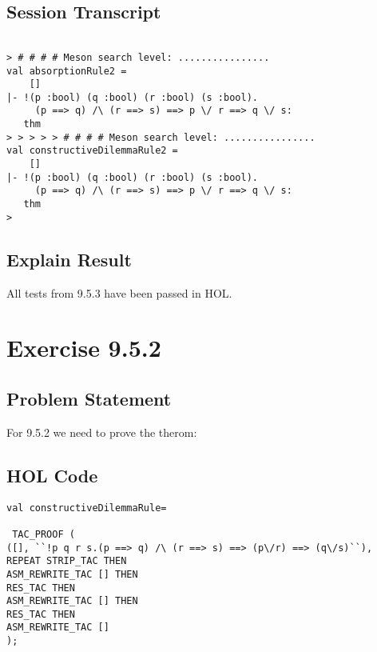 \documentclass{report}
\begin{document}
\section{Session Transcript}
\label{Session Trans 953}
\setcounter{sessioncount}{0}
\begin{session}
  \begin{scriptsize}
\begin{verbatim}

> # # # # Meson search level: ................
val absorptionRule2 =
    []
|- !(p :bool) (q :bool) (r :bool) (s :bool).
     (p ==> q) /\ (r ==> s) ==> p \/ r ==> q \/ s:
   thm
> > > > > # # # # Meson search level: ................
val constructiveDilemmaRule2 =
    []
|- !(p :bool) (q :bool) (r :bool) (s :bool).
     (p ==> q) /\ (r ==> s) ==> p \/ r ==> q \/ s:
   thm
>
\end{verbatim}
  \end{scriptsize}
\end{session}
\section{Explain Result}
\label{explain result 953}
All tests from 9.5.3 have been passed in HOL.

\chapter{Exercise 9.5.2}
\label{ex 952}

\section{Problem Statement}
\label{problem state 952}
For 9.5.2 we need to prove the therom:
\HOLexerciseNineTheoremsconstructiveDilemmaRule

\section{HOL Code}
\label{HOl Code 952}

\begin{lstlisting}[frame=trBL]
val constructiveDilemmaRule=

 TAC_PROOF (
([], ``!p q r s.(p ==> q) /\ (r ==> s) ==> (p\/r) ==> (q\/s)``),
REPEAT STRIP_TAC THEN
ASM_REWRITE_TAC [] THEN
RES_TAC THEN
ASM_REWRITE_TAC [] THEN
RES_TAC THEN
ASM_REWRITE_TAC []
);

\end{lstlisting}
\end{document}

